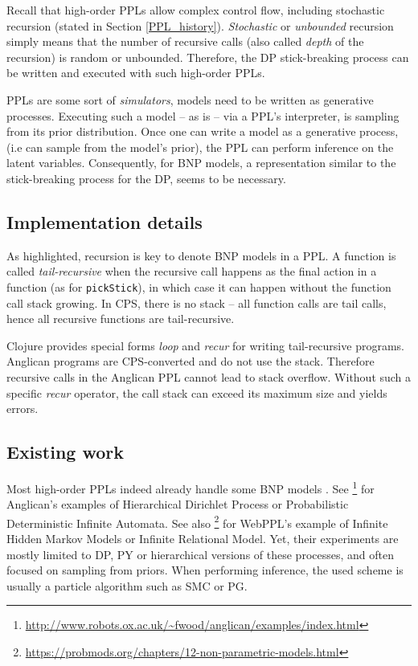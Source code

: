 Recall that high-order \glspl{PPL} allow complex control flow, including stochastic recursion (stated in Section \ref{PPL_history}). \textit{Stochastic} or \textit{unbounded} recursion simply means that the number of recursive calls (also called \textit{depth} of the recursion) is random or unbounded. Therefore, the \gls{DP} stick-breaking process can be written and executed with such high-order \glspl{PPL}.

\glspl{PPL} are some sort of \textit{simulators}, models need to be written as generative processes. Executing such a model -- as is -- via a \gls{PPL}'s interpreter, is sampling from its prior distribution. Once one can write a model as a generative process, (i.e can sample from the model's prior), the \gls{PPL} can perform inference on the latent variables. Consequently, for \gls{BNP} models, a representation similar to the stick-breaking process for the \gls{DP}, seems to be necessary.

\subsection{Implementation details}
As highlighted, recursion is key to denote \gls{BNP} models in a \gls{PPL}.
A function is called \textit{tail-recursive} when the recursive call happens as the final action in a function (as for \texttt{pickStick}), in which case it can happen without the function call stack growing. In \gls{CPS}, there is no stack -- all function calls are tail calls, hence all recursive functions are tail-recursive.

Clojure provides special forms \emph{loop} and \emph{recur} for writing tail-recursive programs. Anglican programs are \gls{CPS}-converted and do not use the stack. Therefore recursive calls in the Anglican \gls{PPL} cannot lead to stack overflow.
Without such a specific \emph{recur} operator, the call stack can exceed its maximum size and yields errors.

\subsection{Existing work}

Most high-order \glspl{PPL} indeed already handle some \gls{BNP} models \cite{Goodman:2012uq,wood-aistats-2014,probmods2}.
See \footnote{\url{http://www.robots.ox.ac.uk/~fwood/anglican/examples/index.html}} for Anglican's examples of Hierarchical Dirichlet Process or Probabilistic Deterministic Infinite Automata. See also \footnote{\url{https://probmods.org/chapters/12-non-parametric-models.html}} for WebPPL's example of Infinite Hidden Markov Models or Infinite Relational Model.
Yet, their experiments are mostly limited to \acrlong{DP}, \acrlong{PY} or hierarchical versions of these processes, and often focused on sampling from priors. When performing inference,
the used scheme is usually a particle algorithm such as \acrlong{SMC} or \acrlong{PG}.


